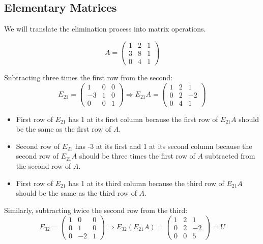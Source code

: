 \documentclass[12pt]{article}
\begin{document}
\subsection{Elementary Matrices}

We will translate the elimination process into matrix operations.

\[
A=
\left(
    \begin{matrix}
        1 & 2 & 1\\ 
        3 & 8 & 1\\
        0 & 4 & 1
    \end{matrix}
\right)
\]

Subtracting three times the first row from the second:
\[
E_{21}=
\left(
    \begin{matrix}
        1 & 0 & 0\\ 
        \boxed{-3} & 1 & 0\\
        0 & 0 & 1
    \end{matrix}
\right)
\Rightarrow
E_{21}A
=
\left(
    \begin{matrix}
        1 & 2 & 1\\ 
        0 & 2 & -2\\
        0 & 4 & 1
    \end{matrix}
\right)
\]
\begin{itemize}
    \item First row of $E_{21}$ has 1 at its first column because the first row of $E_{21}A$ should be the same as the first row of $A$.
    \item Second row of $E_{21}$ has -3 at its first and 1 at its second column because the second row of $E_{21}A$ should be three times the first row of $A$ subtracted from the second row of $A$.
    \item First row of $E_{21}$ has 1 at its third column because the third row of $E_{21}A$ should be the same as the third row of $A$.
\end{itemize}

Similarly, subtracting twice the second row from the third:
\[
E_{32}=
\left(
    \begin{matrix}
        1 & 0 & 0\\ 
        0 & 1 & 0\\
        0 & \boxed{-2} & 1
    \end{matrix}
\right)
\Rightarrow
E_{32}(E_{21}A)
=
\left(
    \begin{matrix}
        1 & 2 & 1\\ 
        0 & 2 & -2\\
        0 & 0 & 5
    \end{matrix}
\right)
=U
\]
\end{document}
